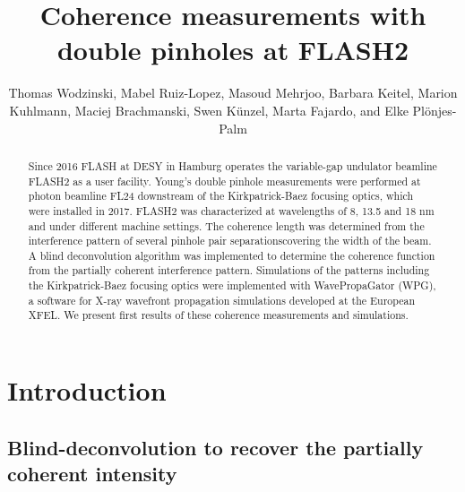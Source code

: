 \documentclass{osa-article}
\begin{document}
\title{Coherence measurements with double pinholes at FLASH2}

\author{Thomas Wodzinski, Mabel Ruiz-Lopez, Masoud Mehrjoo, Barbara Keitel, Marion Kuhlmann, Maciej Brachmanski, Swen K\"{u}nzel, Marta Fajardo, and Elke Pl\"{o}njes-Palm}

\address{GoLP/Instituto de Plasmas e Fus\~{a}o Nuclear, Instituto Superior T\'{e}cnico, 1049-001 Lisboa, Portugal\\
Deutsches Elektronen-Synchrotron DESY, Notkestrasse 85, 22607 Hamburg, Germany}




\begin{abstract}

Since 2016 FLASH at DESY in Hamburg operates the variable-gap undulator beamline FLASH2 as a user facility. Young's double pinhole measurements were performed at photon beamline FL24 downstream of the Kirkpatrick-Baez focusing optics, which were installed in 2017. FLASH2 was characterized at wavelengths of 8, 13.5 and 18 nm and under different machine settings. The coherence length was determined from the interference pattern of several pinhole pair separationscovering the width of the beam. A blind deconvolution algorithm was implemented to determine the coherence function from the partially coherent interference pattern. Simulations of the patterns including the Kirkpatrick-Baez focusing optics were implemented with WavePropaGator (WPG), a software for X-ray wavefront propagation simulations developed at the European XFEL. We present first results of these coherence measurements and simulations.
\end{abstract}

\section{Introduction}

\subsection{Blind-deconvolution to recover the partially coherent intensity}
\end{document}
